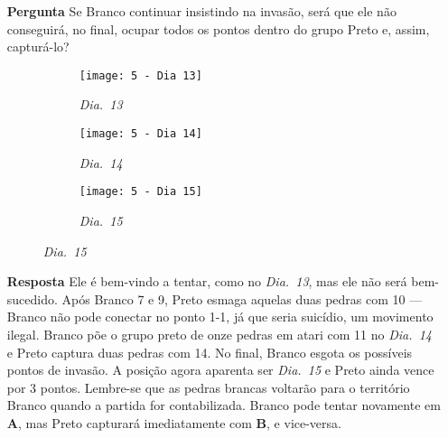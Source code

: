 \begin{itemize}
    \begin{figure}[h!]
      \centering
      \begin{subfigure}[t]{.3\textwidth}
        \centering
        \texttt{[image: 5 - Dia 11]}
        \captionsetup{justification=centering}
        \caption*{\emph{Dia.\@~11}}
      \end{subfigure}
      \hspace{1cm}
      \begin{subfigure}[t]{.3\textwidth}
        \centering
        \texttt{[image: 5 - Dia 12]}
        \captionsetup{justification=centering}
        \caption*{\emph{Dia.\@~12}}
      \end{subfigure}
    \end{figure}

  \item[\textbf{Pergunta}]
    Se Branco continuar insistindo na invasão, será que ele não conseguirá, no final, ocupar todos os pontos dentro do grupo Preto e, assim, capturá-lo?

    \begin{figure}[h!]
      \centering
      \begin{subfigure}[t]{.3\textwidth}
        \centering
        \texttt{[image: 5 - Dia 13]}
        \captionsetup{justification=centering}
        \caption*{\emph{Dia.\@~13}}
      \end{subfigure}
      \hfill
      \begin{subfigure}[t]{.3\textwidth}
        \centering
        \texttt{[image: 5 - Dia 14]}
        \captionsetup{justification=centering}
        \caption*{\emph{Dia.\@~14}}
      \end{subfigure}
      \hfill
      \begin{subfigure}[t]{.3\textwidth}
        \centering
        \texttt{[image: 5 - Dia 15]}
        \captionsetup{justification=centering}
        \caption*{\emph{Dia.\@~15}}
      \end{subfigure}
    \end{figure}

  \item[\textbf{Resposta}]
    Ele é bem-vindo a tentar, como no \emph{Dia.\@~13}, mas ele não será bem-sucedido. Após Branco 7 e 9, Preto esmaga aquelas duas pedras com 10 --- Branco não pode conectar no ponto 1-1, já que seria suicídio, um movimento ilegal. Branco põe o grupo preto de onze pedras em atari com 11 no \emph{Dia.\@~14} e Preto captura duas pedras com 14. No final, Branco esgota os possíveis pontos de invasão. A posição agora aparenta ser \emph{Dia.\@~15} e Preto ainda vence por 3 pontos. Lembre-se que as pedras brancas voltarão para o território Branco quando a partida for contabilizada. Branco pode tentar novamente em \textbf{A}, mas Preto capturará imediatamente com \textbf{B}, e vice-versa.


\end{itemize}
